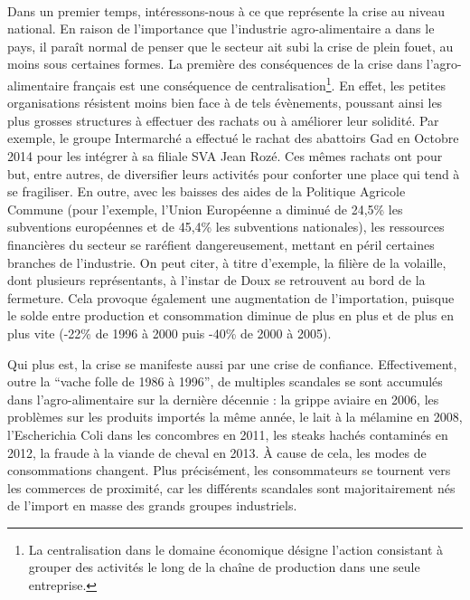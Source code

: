 \documentclass[a4paper,12pt]{report}
\begin{document}
			\paragraph{}Dans un premier temps, intéressons-nous à ce que représente la crise au niveau national. En raison de l'importance que l'industrie agro-alimentaire a dans le pays, il paraît normal de penser que le secteur ait subi la crise de plein fouet, au moins sous certaines formes. La première des conséquences de la crise dans l'agro-alimentaire français est une conséquence de centralisation\footnote{La centralisation dans le domaine économique désigne l'action consistant à grouper des activités le long de la chaîne de production dans une seule entreprise.}. En effet, les petites organisations résistent moins bien face à de tels évènements, poussant ainsi les plus grosses structures à effectuer des rachats ou à améliorer leur solidité. Par exemple, le groupe Intermarché a effectué le rachat des abattoirs Gad en Octobre 2014 pour les intégrer à sa filiale SVA Jean Rozé. Ces mêmes rachats ont pour but, entre autres, de diversifier leurs activités pour conforter une place qui tend à se fragiliser. En outre, avec les baisses des aides de la Politique Agricole Commune (pour l’exemple, l’Union Européenne a diminué de 24,5\% les subventions européennes et de 45,4\% les subventions nationales), les ressources financières du secteur se raréfient dangereusement, mettant en péril certaines branches de l’industrie. On peut citer, à titre d’exemple, la filière de la volaille, dont plusieurs représentants, à l’instar de Doux se retrouvent au bord de la fermeture. Cela provoque également une augmentation de l’importation, puisque le solde entre production et consommation diminue de plus en plus et de plus en plus vite (-22\% de 1996 à 2000 puis -40\% de 2000 à 2005)\cite{AvenirExploitationVolailleBretonne}.

			Qui plus est, la crise se manifeste aussi par une crise de confiance. Effectivement, outre la “vache folle de 1986 à 1996”, de multiples scandales se sont accumulés dans l’agro-alimentaire sur la dernière décennie\cite{Scandales} : la grippe aviaire en 2006, les problèmes sur les produits importés la même année, le lait à la mélamine en 2008, l’Escherichia Coli dans les concombres en 2011, les steaks hachés contaminés en 2012, la fraude à la viande de cheval en 2013. À cause de cela, les modes de consommations changent. Plus précisément, les consommateurs se tournent vers les commerces de proximité, car les différents scandales sont majoritairement nés de l’import en masse des grands groupes industriels.
			
\end{document}
